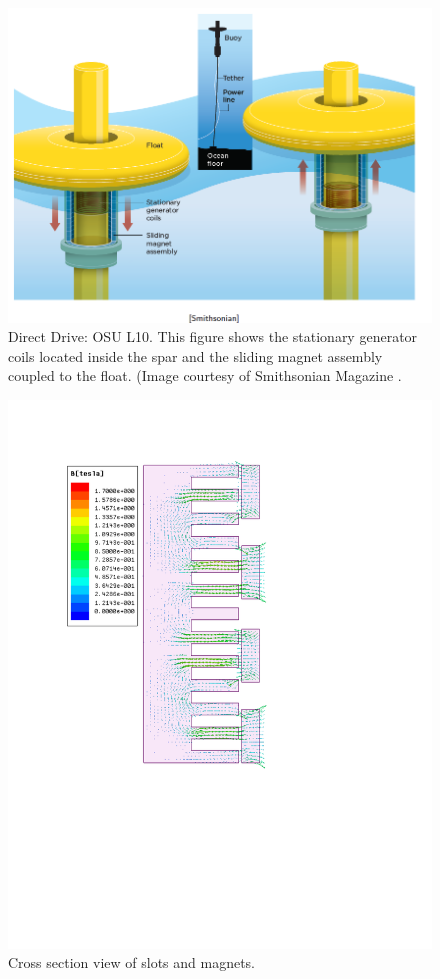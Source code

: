 \documentclass[twocolumn,10pt]{asme2e}
\begin{document}
\begin{figure}[t]
    \centering
    \includegraphics[width=1\columnwidth]{Images/PAWECSmithsonian}
    \caption{Direct Drive: OSU L10. This figure shows the stationary generator coils located inside the spar and the sliding magnet assembly coupled to the float.  (Image courtesy of Smithsonian Magazine \cite{Rusch:2009aa}.} 
    \label{L10}
    \end{figure}

\begin{figure}[t]
    \centering
    \includegraphics[width=1\columnwidth]{Images/Slots_n_Magnets_Linear}
    \caption{Cross section view of slots and magnets.}
    \label{magnets}
    \end{figure} 
\end{document}
